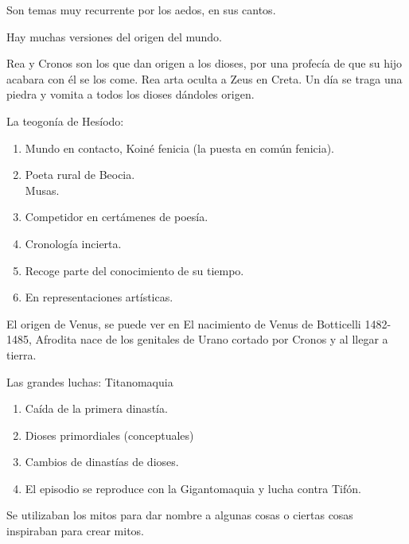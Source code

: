 Son temas muy recurrente por los aedos, en sus cantos.

Hay muchas versiones del origen del mundo.

Rea y Cronos son los que dan origen a los dioses, por una profecía de que su hijo acabara con él se los come. Rea arta oculta a Zeus en Creta. Un día se traga una piedra y vomita a todos los dioses dándoles origen.
\pagebreak

La teogonía de Hesíodo:
\begin{enumerate}
  \item Mundo en contacto, Koiné fenicia (la puesta en común fenicia).
  \item Poeta rural de Beocia. \\ Musas.
  \item Competidor en certámenes de poesía.
  \item Cronología incierta.
  \item Recoge parte del conocimiento de su tiempo.
  \item En representaciones artísticas.
\end{enumerate}

El origen de Venus, se puede ver en El nacimiento de Venus de Botticelli 1482-1485, Afrodita nace de los genitales de Urano cortado por Cronos y al llegar a tierra.

Las grandes luchas: Titanomaquia
\begin{enumerate}
  \item Caída de la primera dinastía.
  \item Dioses primordiales (conceptuales)
  \item Cambios de dinastías de dioses.
  \item El episodio se reproduce con la Gigantomaquia y lucha contra Tifón.
\end{enumerate}

Se utilizaban los mitos para dar nombre a algunas cosas o ciertas cosas inspiraban para crear mitos.
